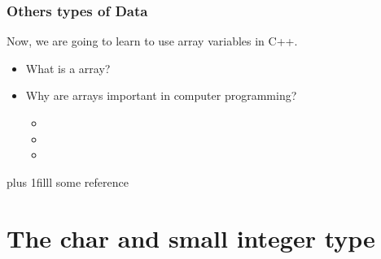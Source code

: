 \documentclass[fleqn]{beamer} %
\newcommand{\sectiontitleI}{Others types of Data} %
\newcommand{\sectiontitleII}{The char and small integer type}
\newcommand{\btVFill}{\vskip0pt plus 1filll}
\begin{document}
	\begin{frame} \small
		\frametitle{\sectiontitleI}
	
			Now, we are going to learn to use array variables in C++. \vspace{5mm}\\
			
			\begin{itemize}
			
			\item What is a array? \vspace{5mm} \\
			
			\item Why are arrays important in computer programming? \vspace{5mm}\\
			
				\begin{itemize}
				
					\item 
					
					\item 
					
					\item 
				
				\end{itemize}
	
			\end{itemize}
	
		\btVFill
		\tiny{some reference}	
	\end{frame}


\section{\sectiontitleII}
\end{document}
